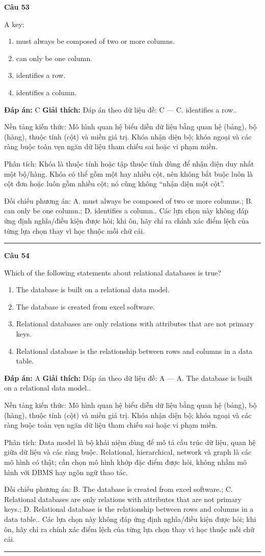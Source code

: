 \documentclass[11pt,a4paper]{article}
\newenvironment{question}[1]{%
  \par\vspace{1em}\noindent\textbf{\large Câu #1}\par\vspace{0.4em}
}{%
  \par\vspace{1em}\hrule\vspace{0.6em}
}
\newenvironment{choices}{%
  \begin{enumerate}[label=\textbf{\Alph*.},leftmargin=2.2em,itemsep=2pt,topsep=3pt]
}{%
  \end{enumerate}
}
\newcommand{\choice}{\item}
\begin{document}
\begin{question}{53}
A key:
\begin{choices}
\choice must always be composed of two or more columns.
\choice can only be one column.
\choice identifies a row.
\choice identifies a column.
\end{choices}
\textbf{Đáp án:} C
\textbf{Giải thích:} Đáp án theo dữ liệu đề: C — C. identifies a row..

Nền tảng kiến thức: Mô hình quan hệ biểu diễn dữ liệu bằng quan hệ (bảng), bộ (hàng), thuộc tính (cột) và miền giá trị. Khóa nhận diện bộ; khóa ngoại và các ràng buộc toàn vẹn ngăn dữ liệu tham chiếu sai hoặc vi phạm miền.

Phân tích: Khóa là thuộc tính hoặc tập thuộc tính dùng để nhận diện duy nhất một bộ/hàng. Khóa có thể gồm một hay nhiều cột, nên không bắt buộc luôn là cột đơn hoặc luôn gồm nhiều cột; nó cũng không “nhận diện một cột”.

Đối chiếu phương án: A. must always be composed of two or more columns.; B. can only be one column.; D. identifies a column.. Các lựa chọn này không đáp ứng định nghĩa/điều kiện được hỏi; khi ôn, hãy chỉ ra chính xác điểm lệch của từng lựa chọn thay vì học thuộc mỗi chữ cái.
\end{question}

\begin{question}{54}
Which of the following statements about relational databases is true?
\begin{choices}
\choice The database is built on a relational data model.
\choice The database is created from excel software.
\choice Relational databases are only relations with attributes that are not primary keys.
\choice Relational database is the relationship between rows and columns in a data table.
\end{choices}
\textbf{Đáp án:} A
\textbf{Giải thích:} Đáp án theo dữ liệu đề: A — A. The database is built on a relational data model..

Nền tảng kiến thức: Mô hình quan hệ biểu diễn dữ liệu bằng quan hệ (bảng), bộ (hàng), thuộc tính (cột) và miền giá trị. Khóa nhận diện bộ; khóa ngoại và các ràng buộc toàn vẹn ngăn dữ liệu tham chiếu sai hoặc vi phạm miền.

Phân tích: Data model là bộ khái niệm dùng để mô tả cấu trúc dữ liệu, quan hệ giữa dữ liệu và các ràng buộc. Relational, hierarchical, network và graph là các mô hình có thật; cần chọn mô hình khớp đặc điểm được hỏi, không nhầm mô hình với DBMS hay ngôn ngữ thao tác.

Đối chiếu phương án: B. The database is created from excel software.; C. Relational databases are only relations with attributes that are not primary keys.; D. Relational database is the relationship between rows and columns in a data table.. Các lựa chọn này không đáp ứng định nghĩa/điều kiện được hỏi; khi ôn, hãy chỉ ra chính xác điểm lệch của từng lựa chọn thay vì học thuộc mỗi chữ cái.
\end{question}
\end{document}
